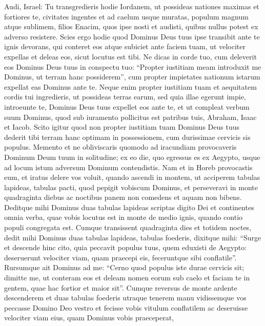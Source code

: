 \begin{biblechapter} 
\verse Audi, Israel: Tu transgredieris hodie Iordanem, ut possideas nationes maximas et fortiores te, civitates ingentes et ad caelum usque muratas, 
\verse populum magnum atque sublimem, filios Enacim, quos ipse nosti et audisti, quibus nullus potest ex adverso resistere. 
\verse Scies ergo hodie quod Dominus Deus tuus ipse transibit ante te ignis devorans, qui conteret eos atque subiciet ante faciem tuam, ut velociter expellas et deleas eos, sicut locutus est tibi. 
\verse Ne dicas in corde tuo, cum deleverit eos Dominus Deus tuus in conspectu tuo: “Propter iustitiam meam introduxit me Dominus, ut terram hanc possiderem”, cum propter impietates nationum istarum expellat eas Dominus ante te. 
\verse Neque enim propter iustitiam tuam et aequitatem cordis tui ingredieris, ut possideas terras earum, sed quia illae egerunt impie, introeunte te, Dominus Deus tuus expellet eos ante te, et ut compleat verbum suum Dominus, quod sub iuramento pollicitus est patribus tuis, Abraham, Isaac et Iacob. 
\verse Scito igitur quod non propter iustitiam tuam Dominus Deus tuus dederit tibi terram hanc optimam in possessionem, cum durissimae cervicis sis populus. 
\verse Memento et ne obliviscaris quomodo ad iracundiam provocaveris Dominum Deum tuum in solitudine; ex eo die, quo egressus es ex Aegypto, usque ad locum istum adversum Dominum contendistis. 
\verse Nam et in Horeb provocastis eum, et iratus delere vos voluit, 
\verse quando ascendi in montem, ut acciperem tabulas lapideas, tabulas pacti, quod pepigit vobiscum Dominus, et perseveravi in monte quadraginta diebus ac noctibus panem non comedens et aquam non bibens. 
\verse Deditque mihi Dominus duas tabulas lapideas scriptas digito Dei et continentes omnia verba, quae vobis locutus est in monte de medio ignis, quando contio populi congregata est. 
\verse Cumque transissent quadraginta dies et totidem noctes, dedit mihi Dominus duas tabulas lapideas, tabulas foederis, 
\verse dixitque mihi: “Surge et descende hinc cito, quia peccavit populus tuus, quem eduxisti de Aegypto: deseruerunt velociter viam, quam praecepi eis, feceruntque sibi conflatile”. 
\verse Rursumque ait Dominus ad me: “Cerno quod populus iste durae cervicis sit; 
\verse dimitte me, ut conteram eos et deleam nomen eorum sub caelo et faciam te in gentem, quae hac fortior et maior sit”. 
\verse Cumque reversus de monte ardente descenderem et duas tabulas foederis utraque tenerem manu 
\verse vidissemque vos peccasse Domino Deo vestro et fecisse vobis vitulum conflatilem ac deseruisse velociter viam eius, quam Dominus vobis praeceperat, 

\end{biblechapter}
